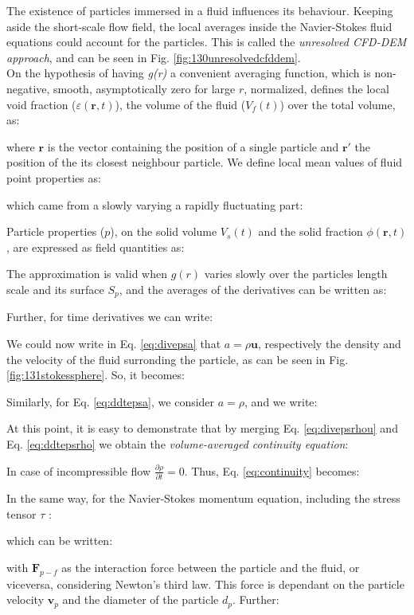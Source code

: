 The existence of particles immersed in a fluid influences its behaviour. 
Keeping aside the short-scale flow field, the local averages inside the
Navier-Stokes fluid equations could account for the particles.
This is called the \textit{unresolved \acs{CFD}-\acs{DEM} approach}, and can be
seen in Fig. \ref{fig:130unresolvedcfddem}.\\

On the hypothesis of having \textit{g(r)} a convenient averaging
function, which is non-negative, smooth, asymptotically zero for large $r$, normalized, \citet{RefWorks:201}
defines the local void fraction ($\varepsilon(\mathbf{r},t)$), the volume of the
fluid ($V_f(t)$) over the total volume, as:

where $\mathbf{r}$ is the vector containing the position of a single particle
and $\mathbf{r'}$ the position of the its closest neighbour particle.
We define local mean values of fluid point properties as:

which came from a slowly varying a rapidly fluctuating part:

Particle properties ($p$), on the solid volume $V_s(t)$ and the solid fraction
$\phi(\mathbf{r},t)$, are expressed as field quantities as:

The approximation is valid when $g(r)$ varies slowly over the particles length
scale and its surface $S_p$, and the averages of the derivatives can be written
as:

Further, for time derivatives we can write:


We could now write in Eq. \ref{eq:divepsa} that $a = \rho \mathbf{u}$,
respectively the density and the velocity of the fluid surronding the particle, as can be
seen in Fig. \ref{fig:131stokessphere}. So, it becomes:

Similarly, for Eq. \ref{eq:ddtepsa}, we consider $a = \rho$, and we write:

At this point, it is easy to demonstrate that by merging Eq. \ref{eq:divepsrhou}
and Eq. \ref{eq:ddtepsrho} we obtain the \textit{volume-averaged continuity
equation}:

In case of incompressible flow $\frac{\partial \rho}{\partial t} = 0$. Thus,
Eq.
\ref{eq:continuity} becomes:

In the same way, for the Navier-Stokes momentum equation, including the stress
tensor $\tau$ \cite{Refworks:202}:

which can be written:

with $\mathbf{F}_{p-f}$ as the interaction force between the particle and the
fluid, or viceversa, considering Newton's third law.
This force is dependant on the particle
velocity $\mathbf{v}_{p}$ and the diameter of the particle $d_p$. Further:
